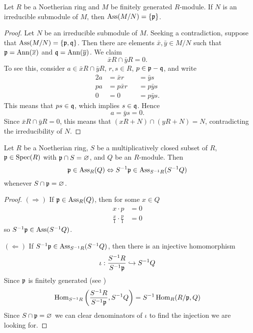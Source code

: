 \documentclass{ximera}
\begin{document}
\begin{lemma}\label{L:irrassassin}
  Let $R$ be a Noetherian ring and $M$ be finitely generated
  $R$-module. If $N$ is an irreducible submodule of $M$, then
  $\operatorname{Ass}(M/N)=\{\mathfrak{p}\}$.
  \begin{proof}
    Let $N$ be an irreducible submodule of $M$. Seeking a
    contradiction, suppose that $\operatorname{Ass}(M/N) = \{\mathfrak{p},\mathfrak{q}\}$. Then there
    are elements $\bar{x},\bar{y}\in M/N$ such that $\mathfrak{p}=\operatorname{Ann}(\overline{x})$
    and $\mathfrak{q}=\operatorname{Ann}(\overline{y})$. We claim
    \[
    \bar{x}R \cap \bar{y}R = 0.
    \]
    To see this, consider $a\in\bar{x}R \cap \bar{y}R$, $r,s\in R$,
    $p\in \mathfrak{p}-\mathfrak{q}$, and write
    \begin{alignat*}{2}
      a &= \bar{x} r & &= \bar{y} s\\
      pa &= p\bar{x} r & &= p\bar{y} s\\
      0  &= 0  & &= p\bar{y} s.
    \end{alignat*}
    This means that $ps\in\mathfrak{q}$, which implies $s\in\mathfrak{q}$. Hence
    \[
    a = \bar{y}s = 0.
    \]
    Since $\bar{x}R \cap \bar{y}R = 0$, this means that $(xR
    +N)\cap(yR+N) = N$, contradicting the irreducibility of $N$.
  \end{proof}
\end{lemma}

\begin{proposition}\label{P:assassinlocal}
  Let $R$ be a Noetherian ring, $S$ be a multiplicatively closed
  subset of $R$, $\mathfrak{p}\in\operatorname{Spec}(R)$ with $\mathfrak{p}\cap S = \varnothing$, and $Q$
  be an $R$-module. Then
  \[
  \mathfrak{p} \in \operatorname{Ass}_R(Q) \Leftrightarrow S^{-1}\mathfrak{p}\in \operatorname{Ass}_{S^{-1}R}(S^{-1}Q)
  \]
  whenever $S\cap\mathfrak{p} = \varnothing$.
  \begin{proof}
    $(\Rightarrow)$ If $\mathfrak{p}\in\operatorname{Ass}_R(Q)$, then for some $x\in Q$
    \begin{align*}
    x\cdot p &= 0\\
    \frac{x}{1} \cdot \frac{p}{1} &= 0
    \end{align*}
    so $S^{-1} \mathfrak{p}\in \operatorname{Ass}(S^{-1}Q)$.

    $(\Leftarrow)$ If $S^{-1}\mathfrak{p}\in \operatorname{Ass}_{S^{-1}R}(S^{-1}Q)$, then
    there is an injective homomorphism
    \[
    \iota:\frac{S^{-1}R}{S^{-1}\mathfrak{p}}\hookrightarrow S^{-1}Q
    \]
    Since $\mathfrak{p}$ is finitely generated (see \cite[Proposition 2.10]{dE1995})
    \[
    \operatorname{Hom}_{S^{-1}R}\left(\frac{S^{-1}R}{S^{-1}\mathfrak{p}},S^{-1}Q\right) = S^{-1}\operatorname{Hom}_{R}(R/\mathfrak{p},Q)
    \]
    Since $S\cap\mathfrak{p}=\varnothing$ we can clear denominators of $\iota$ to find the
    injection we are looking for.
  \end{proof}
\end{proposition}
\end{document}
